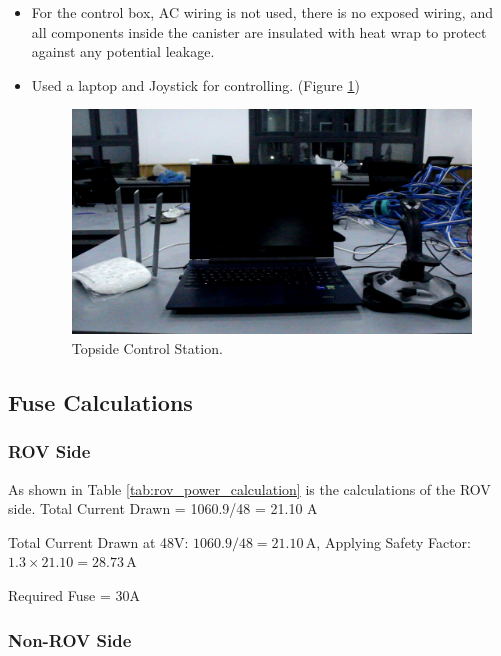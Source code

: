 \documentclass[11pt, twocolumn]{article}
\begin{document}
\begin{itemize}[leftmargin=0pt, itemindent=10pt]
    \setlength{\itemsep}{0pt}
    \item For the control box, AC wiring is not used, there is no exposed wiring, and all components inside the canister are insulated with heat wrap to protect against any potential leakage.
    
    \item Used a laptop and Joystick for controlling. (Figure \ref{fig:station})
    
    \begin{figure}[h!]
        \centering
        \includegraphics[width=0.8\columnwidth]{Images/Station.png}
        \caption{Topside Control Station.}
        \label{fig:station}
    \end{figure}
\end{itemize}

\subsection{Fuse Calculations}
\subsubsection{ROV Side}

As shown in Table \ref{tab:rov_power_calculation} is the calculations of the ROV side. Total Current Drawn = 1060.9/48 = 21.10 A

Total Current Drawn at 48V: \( 1060.9 / 48 = 21.10 \, \text{A} \), Applying Safety Factor: \( 1.3 \times 21.10 = 28.73 \, \text{A} \)
\setlength{\parskip}{0pt}

Required Fuse = 30A

\subsubsection{Non-ROV Side}
\end{document}
